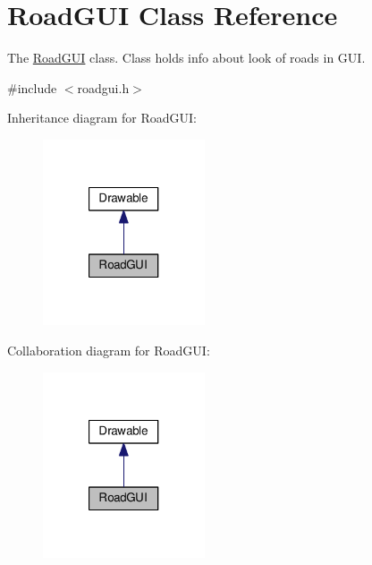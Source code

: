 \hypertarget{classRoadGUI}{\section{Road\-G\-U\-I Class Reference}
\label{classRoadGUI}
}


The \hyperlink{classRoadGUI}{Road\-G\-U\-I} class. Class holds info about look of roads in G\-U\-I.  




{\ttfamily \#include $<$roadgui.\-h$>$}



Inheritance diagram for Road\-G\-U\-I\-:
\nopagebreak
\begin{figure}[H]
\begin{center}
\leavevmode
\includegraphics[width=136pt]{classRoadGUI__inherit__graph}
\end{center}
\end{figure}


Collaboration diagram for Road\-G\-U\-I\-:
\nopagebreak
\begin{figure}[H]
\begin{center}
\leavevmode
\includegraphics[width=136pt]{classRoadGUI__coll__graph}
\end{center}
\end{figure}
